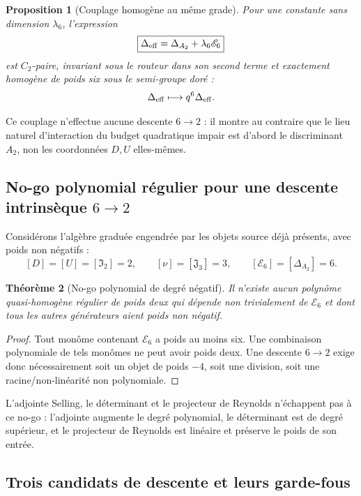 \documentclass[11pt,a4paper]{article}
\newtheorem{theorem}{Théorème}[section]
\newtheorem{proposition}[theorem]{Proposition}
\begin{document}
\begin{proposition}[Couplage homogène au même grade]\label{prop:v20-weight6-coupling}
Pour une constante sans dimension $\lambda_6$, l'expression
\[
 \boxed{
 \Delta_{\rm eff}
 =
 \Delta_{A_2}
 +
 \lambda_6\mathscr E_6}
\]
est $C_2$-paire, invariant sous le routeur dans son second terme et exactement homogène de poids six sous le semi-groupe doré :
\[
 \Delta_{\rm eff}\longmapsto q^6\Delta_{\rm eff}.
\]
\end{proposition}

Ce couplage n'effectue aucune descente $6\to2$ : il montre au contraire que le lieu naturel d'interaction du budget quadratique impair est d'abord le discriminant $A_2$, non les coordonnées $D,U$ elles-mêmes.

\subsection{No-go polynomial régulier pour une descente intrinsèque $6\to2$}

Considérons l'algèbre graduée engendrée par les objets source déjà présents, avec poids non négatifs :
\[
 [D]=[U]=[\mathfrak I_2]=2,\qquad
 [\nu]=[\mathfrak J_3]=3,\qquad
 [\mathscr E_6]=[\Delta_{A_2}]=6.
\]

\begin{theorem}[No-go polynomial de degré négatif]\label{thm:v20-polynomial-nogo}
Il n'existe aucun polynôme quasi-homogène régulier de poids deux qui dépende non trivialement de $\mathscr E_6$ et dont tous les autres générateurs aient poids non négatif.
\end{theorem}

\begin{proof}
Tout monôme contenant $\mathscr E_6$ a poids au moins six. Une combinaison polynomiale de tels monômes ne peut avoir poids deux. Une descente $6\to2$ exige donc nécessairement soit un objet de poids $-4$, soit une division, soit une racine/non-linéarité non polynomiale.
\end{proof}

L'adjointe Selling, le déterminant et le projecteur de Reynolds n'échappent pas à ce no-go : l'adjointe augmente le degré polynomial, le déterminant est de degré supérieur, et le projecteur de Reynolds est linéaire et préserve le poids de son entrée.

\subsection{Trois candidats de descente et leurs garde-fous}
\end{document}

